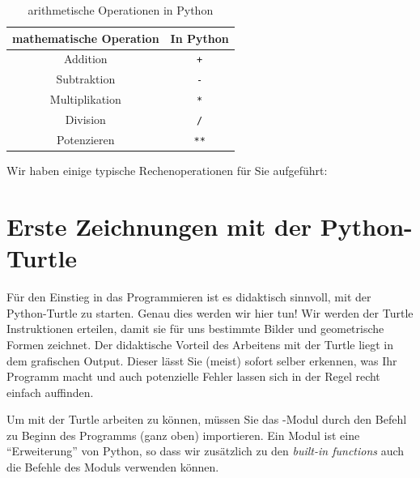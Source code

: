 \begin{myoverview}
	\begin{table}[H]
		\centering
		\begin{tabular}{c|c}
			\textbf{mathematische Operation} & \textbf{In Python} \\\midrule\midrule
			Addition                         & \lstinline|+|      \\\midrule
			Subtraktion                      & \lstinline|-|      \\\midrule
			Multiplikation                   & \lstinline|*|      \\\midrule
			Division                         & \lstinline|/|      \\\midrule
			Potenzieren                      & \lstinline|**|
		\end{tabular}
		\caption{arithmetische Operationen in Python}
		\label{tab:arithm-op}
	\end{table}
\end{myoverview}
\begin{myexample}\label{myexample:basisoperationen}
Wir haben einige typische Rechenoperationen für Sie aufgeführt:

\end{myexample}

\section{Erste Zeichnungen mit der Python-Turtle}
Für den Einstieg in das Programmieren ist es didaktisch sinnvoll, mit der Python-Turtle zu starten. Genau dies werden wir hier tun! Wir werden der Turtle Instruktionen erteilen, damit sie für uns bestimmte Bilder und geometrische Formen zeichnet. Der didaktische Vorteil des Arbeitens mit der Turtle liegt in dem grafischen Output. Dieser lässt Sie (meist) sofort selber erkennen, was Ihr Programm macht und auch potenzielle Fehler lassen sich in der Regel recht einfach auffinden.

Um mit der Turtle arbeiten zu können, müssen Sie das -Modul durch den Befehl  zu Beginn des Programms (ganz oben) importieren. Ein Modul ist eine \enquote{Erweiterung} von Python, so dass wir zusätzlich zu den \textit{built-in functions} auch die Befehle des Moduls verwenden können.

